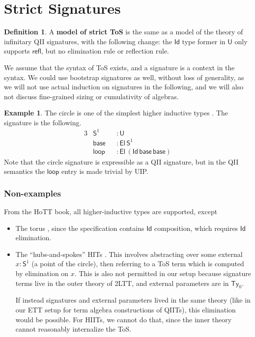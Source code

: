 \documentclass[12pt,a4paper,twoside,openany]{book}
\theoremstyle{remark}
\theoremstyle{definition}
\newtheorem{mydefinition}{Definition}
\newtheorem{myexample}{Example}
\theoremstyle{theorem}
\newcommand{\ms}[1]{\mathsf{#1}}
\newcommand{\refl}{\mathsf{refl}}
\newcommand{\Ty}{\mathsf{Ty}}
\newcommand{\U}{\mathsf{U}}
\newcommand{\El}{\mathsf{El}}
\newcommand{\Id}{\mathsf{Id}}
\begin{document}
\section{Strict Signatures}

\begin{mydefinition}
A \textbf{model of strict ToS} is the same as a model of the theory of
infinitary QII signatures, with the following change: the $\Id$ type former in
$\U$ only supports $\refl$, but no elimination rule or reflection rule.
\end{mydefinition}

We assume that the syntax of ToS exists, and a signature is a context in the
syntax. We could use bootstrap signatures as well, without loss of generality,
as we will not use actual induction on signatures in the following, and we will
also not discuss fine-grained sizing or cumulativity of algebras.

\begin{myexample} The circle is one of the simplest higher inductive types \cite[Section~6.4]{hottbook}. The signature is the following.
\begin{alignat*}{3}
  &\ms{S}^1  &&: \U\\
  &\ms{base} &&: \El\,\ms{S}^1\\
  &\ms{loop} &&: \El\,(\Id\,\ms{base}\,\ms{base})
\end{alignat*}
Note that the circle signature is expressible as a QII signature, but in the QII
semantics the $\ms{loop}$ entry is made trivial by UIP.
\end{myexample}

\subsubsection{Non-examples}
From the HoTT book, all higher-inductive types are supported, except
\begin{itemize}
\item
  The torus \cite[Section~6.6]{hottbook}, since the specification contains $\Id$
  composition, which requires $\Id$ elimination.
\item
  The ``hubs-and-spokes'' HITs \cite[Section~6.7]{hottbook}.  This involves
  abstracting over some external $x : \ms{S}^1$ (a point of the circle), then
  referring to a ToS term which is computed by elimination on $x$. This is also
  not permitted in our setup because signature terms live in the outer theory
  of 2LTT, and external parameters are in $\Ty_0$.

  If instead signatures and external parameters lived in the same theory (like in
  our ETT setup for term algebra constructions of QIITs), this elimination would
  be possible. For HIITs, we cannot do that, since the inner theory cannot
  reasonably internalize the ToS.
\end{itemize}
\end{document}
